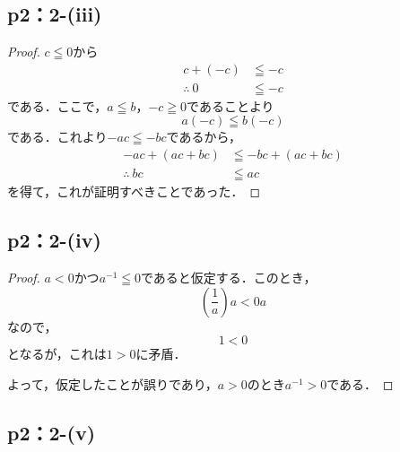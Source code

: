 \documentclass[a4paper,10pt,fleqn]{ltjsarticle}
\begin{document}
    \newpage 

    \subsection*{p2：2-(iii)}
    
    \begin{leftbar}
        \begin{proof}
            $c \leqq 0$から
            \begin{align*} 
                 c+(-c) &\leqq -c \\
                \therefore ~ 0 &\leqq -c 
            \end{align*} 
            である．ここで，$a \leqq b$，$-c \geqq 0$であることより
            \[
                a(-c) \leqq b (-c)
            \]
            である．これより$ -ac \leqq -bc$であるから，
            \begin{align*} 
                -ac + (ac+bc) &\leqq -bc +(ac+bc) \\
                \therefore ~ bc &\leqq ac 
            \end{align*} 
            を得て，これが証明すべきことであった．
        \end{proof}
    \end{leftbar}

    \subsection*{p2：2-(iv)}
    
    \begin{leftbar}
        \begin{proof}
            $a<0$かつ$a^{-1} \leqq 0$であると仮定する．このとき，
            \[
               \left ( \frac{1}{a} \right) a < 0a
            \]
            なので，
            \[
                1<0
            \]
            となるが，これは$1>0$に矛盾．

            よって，仮定したことが誤りであり，$a>0$のとき$a^{-1} >0$である．
            \end{proof}
        \end{leftbar}

        \subsection*{p2：2-(v)}
        
\end{document}
